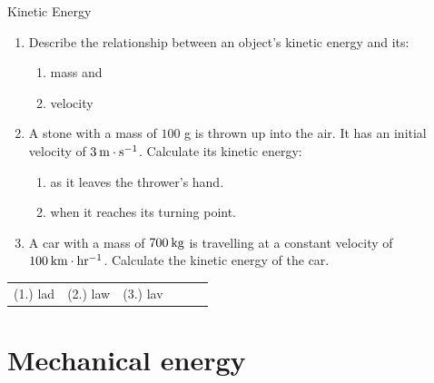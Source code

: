 \label{m38785*secfhsst!!!underscore!!!id1491}
\begin{exercises}{Kinetic Energy }
            \nopagebreak
\noindent \begin{enumerate}[noitemsep, label=\textbf{\arabic*}. ] 
            \label{m38785*uid69}\item Describe the relationship between an object's kinetic energy and its:
\label{m38785*id68139}\begin{enumerate}[noitemsep, label=\textbf{\alph*}. ] 
\label{m38785*uid70}\item mass and
\label{m38785*uid71}\item velocity
\end{enumerate}
\label{m38785*uid72}\item A stone with a mass of $100$ g is thrown up into the air. It has an initial velocity of $3\phantom{\rule{2pt}{0ex}}\text{m}\ensuremath{\cdot}\text{s}{}^{-1}$. Calculate its kinetic energy:
\label{m38785*id68206}\begin{enumerate}[noitemsep, label=\textbf{\alph*}. ] 
            \label{m38785*uid73}\item as it leaves the thrower's hand.
\label{m38785*uid74}\item when it reaches its turning point.
\end{enumerate}
                \label{m38785*uid75}\item A car with a mass of $700\phantom{\rule{2pt}{0ex}}\text{kg}$ is travelling at a constant velocity of $100\phantom{\rule{2pt}{0ex}}\text{km}\ensuremath{\cdot}\text{hr}{}^{-1}$. Calculate the kinetic energy of the car.\newline
\end{enumerate}
  \label{m38785**end}
\par \practiceinfo
 \par \begin{tabular}[h]{cccccc}
 (1.) lad  &  (2.) law  &  (3.) lav  & \end{tabular}
\end{exercises}
         

\section{Mechanical energy}
    \nopagebreak

